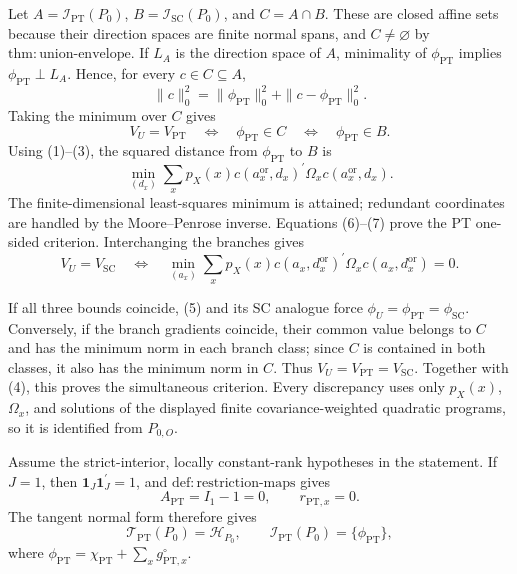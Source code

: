 Let \(A=\mathcal I_{\mathrm{PT}}(P_0)\), \(B=\mathcal I_{\mathrm{SC}}(P_0)\), and \(C=A\cap B\).  These are closed affine sets because their direction spaces are finite normal spans, and \(C\ne\varnothing\) by \(\mathrm{thm{:}union\text{-}envelope}\).  If \(L_A\) is the direction space of \(A\), minimality of \(\phi_{\mathrm{PT}}\) implies \(\phi_{\mathrm{PT}}\perp L_A\).  Hence, for every \(c\in C\subseteq A\),
\[
 \|c\|_0^2=\|\phi_{\mathrm{PT}}\|_0^2+\|c-\phi_{\mathrm{PT}}\|_0^2.
 \tag{5}
\]
Taking the minimum over \(C\) gives
\[
 V_U=V_{\mathrm{PT}}
 \quad\Longleftrightarrow\quad
 \phi_{\mathrm{PT}}\in C
 \quad\Longleftrightarrow\quad
 \phi_{\mathrm{PT}}\in B.
 \tag{6}
\]
Using (1)--(3), the squared distance from \(\phi_{\mathrm{PT}}\) to \(B\) is
\[
 \min_{(d_x)}\sum_xp_X(x)c(a_x^{\mathrm{or}},d_x)^{\prime}
 \Omega_xc(a_x^{\mathrm{or}},d_x).
 \tag{7}
\]
The finite-dimensional least-squares minimum is attained; redundant coordinates are handled by the Moore--Penrose inverse.  Equations (6)--(7) prove the PT one-sided criterion.  Interchanging the branches gives
\[
 V_U=V_{\mathrm{SC}}
 \quad\Longleftrightarrow\quad
 \min_{(a_x)}\sum_xp_X(x)c(a_x,d_x^{\mathrm{or}})^{\prime}
 \Omega_xc(a_x,d_x^{\mathrm{or}})=0.
 \tag{8}
\]

If all three bounds coincide, (5) and its SC analogue force \(\phi_U=\phi_{\mathrm{PT}}=\phi_{\mathrm{SC}}\).  Conversely, if the branch gradients coincide, their common value belongs to \(C\) and has the minimum norm in each branch class; since \(C\) is contained in both classes, it also has the minimum norm in \(C\).  Thus \(V_U=V_{\mathrm{PT}}=V_{\mathrm{SC}}\).  Together with (4), this proves the simultaneous criterion.  Every discrepancy uses only \(p_X(x)\), \(\Omega_x\), and solutions of the displayed finite covariance-weighted quadratic programs, so it is identified from \(P_{0,O}\).

Assume the strict-interior, locally constant-rank hypotheses in the statement.  If \(J=1\), then \(\mathbf 1_J\mathbf 1_J^{\prime}=1\), and \(\mathrm{def{:}restriction\text{-}maps}\) gives
\[
 A_{\mathrm{PT}}=I_1-1=0,
 \qquad
 r_{\mathrm{PT},x}=0.
 \tag{1}
\]
The tangent normal form therefore gives
\[
 \mathcal T_{\mathrm{PT}}(P_0)=\mathcal H_{P_0},
 \qquad
 \mathcal I_{\mathrm{PT}}(P_0)=\{\phi_{\mathrm{PT}}\},
 \tag{2}
\]
where \(\phi_{\mathrm{PT}}=\chi_{\mathrm{PT}}+\sum_xg^{\circ}_{\mathrm{PT},x}\).

